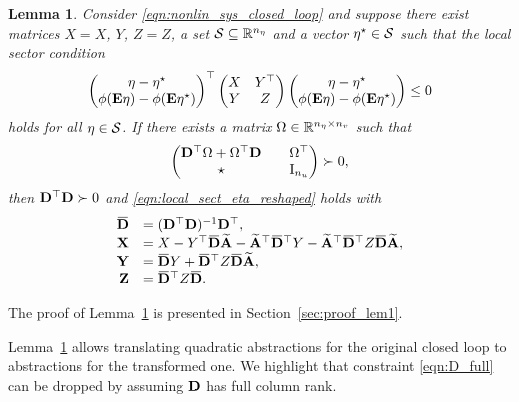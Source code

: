 \documentclass{ifacconf}
\newtheorem{lemma}{Lemma}
\begin{document}
\begin{lemma}\label{lem:orig2reshaped_abs}
    Consider \eqref{eqn:nonlin_sys_closed_loop} and suppose there exist matrices $X=X$, $Y$, $Z=Z$, a set ${\mathcal{S}}\subseteq{\mathbb{R}}^{n_\eta}$ and a vector $\eta^\star\in{\mathcal{S}}$ such that the local sector condition
    \begin{equation}
        \label{eqn:local_sect_eta}
        \left(\begin{matrix}\eta - \eta^\star\\ \phi({\bf{E}}\eta)-\phi({\bf{E}}\eta^\star)\end{matrix}\right)^\top\left(\begin{matrix}X &Y^\top\\Y&Z\end{matrix}\right)\left(\begin{matrix}\eta - \eta^\star\\ \phi({\bf{E}}\eta)-\phi({\bf{E}}\eta^\star)\end{matrix}\right)\le 0
    \end{equation}
    holds for all $\eta\in{\mathcal{S}}$. If there exists a matrix $\Omega\in{\mathbb{R}}^{n_\eta\times n_v}$ such that
        \begin{equation}
    \label{eqn:D_full}
    \left(\begin{matrix}{\bf{D}}^\top \Omega + \Omega^\top {\bf{D}} && \Omega^\top\\
    \star && \operatorname{I}_{n_u}\end{matrix}\right)\succ 0,
\end{equation}
then ${\bf{D}}^\top{\bf{D}}\succ 0$ and \eqref{eqn:local_sect_eta_reshaped} holds with
\begin{equation}
    \label{eqn:original2reshaped_abs_matrices}
    \begin{array}{rl}
        \overbar \bD &= (\bD^\top \bD)^{-1}\bD^\top,\\
         \bX &= X- Y^\top \overbar \bD\widetilde \bA - \widetilde \bA^\top  \overbar \bD^\top Y - \widetilde \bA^\top \overbar \bD^\top Z \overbar \bD\widetilde \bA,\\
         \bY &= \overbar \bD Y + \overbar \bD^\top Z \overbar \bD\widetilde \bA,\\
         \bZ &= \overbar \bD^\top Z \overbar \bD.
    \end{array}
\end{equation}
\end{lemma}
The proof of Lemma~\ref{lem:orig2reshaped_abs} is presented in Section~\ref{sec:proof_lem1}.

Lemma~\ref{lem:orig2reshaped_abs} allows translating quadratic abstractions for the original closed loop to abstractions for the transformed one. We highlight that constraint \eqref{eqn:D_full} can be dropped by assuming ${\bf{D}}$ has full column rank. 
\end{document}
